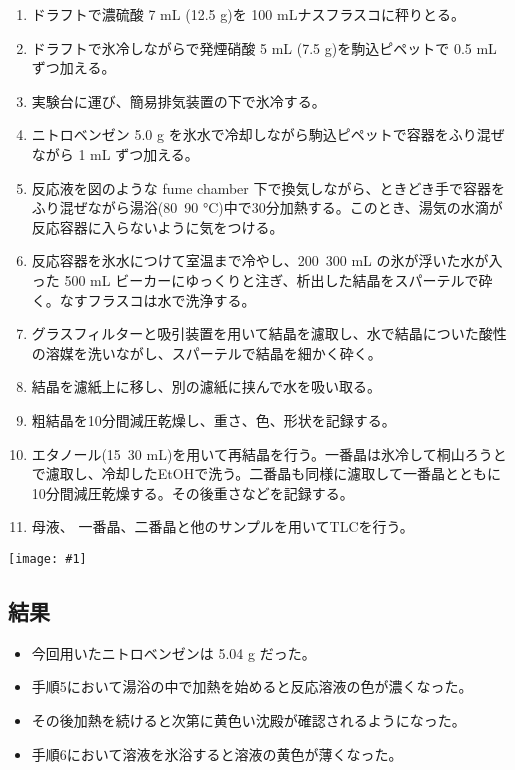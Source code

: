 \documentclass[a4paper,papersize,dvipdfmx]{jsarticle}
\newcommand{\pict}[2]{\begin{center} \texttt{[image: \#1]} \end{center}}   %
\begin{document}
\begin{enumerate}
\item ドラフトで濃硫酸 7 mL (12.5 g)を 100 mLナスフラスコに秤りとる。

\item ドラフトで氷冷しながらで発煙硝酸 5 mL (7.5 g)を駒込ピペットで 0.5 mL ずつ加える。

\item 実験台に運び、簡易排気装置の下で氷冷する。

\item ニトロベンゼン 5.0 g を氷水で冷却しながら駒込ピペットで容器をふり混ぜながら 1 mL ずつ加える。

\item 反応液を図のような fume chamber 下で換気しながら、ときどき手で容器をふり混ぜながら湯浴(80~90 °C)中で30分加熱する。このとき、湯気の水滴が反応容器に入らないように気をつける。

\item 反応容器を氷水につけて室温まで冷やし、200~300 mL の氷が浮いた水が入った 500 mL ビーカーにゆっくりと注ぎ、析出した結晶をスパーテルで砕く。なすフラスコは水で洗浄する。

\item グラスフィルターと吸引装置を用いて結晶を濾取し、水で結晶についた酸性の溶媒を洗いながし、スパーテルで結晶を細かく砕く。

\item 結晶を濾紙上に移し、別の濾紙に挟んで水を吸い取る。

\item 粗結晶を10分間減圧乾燥し、重さ、色、形状を記録する。

\item エタノール(15~30 mL)を用いて再結晶を行う。一番晶は氷冷して桐山ろうとで濾取し、冷却したEtOHで洗う。二番晶も同様に濾取して一番晶とともに10分間減圧乾燥する。その後重さなどを記録する。

\item 母液、 一番晶、二番晶と他のサンプルを用いてTLCを行う。

\end{enumerate}
\pict{imgs/1-zu.jpeg}{5}
\subsection*{結果}
\begin{itemize}
\item 今回用いたニトロベンゼンは 5.04 g だった。
\item 手順5において湯浴の中で加熱を始めると反応溶液の色が濃くなった。
\item その後加熱を続けると次第に黄色い沈殿が確認されるようになった。
\item 手順6において溶液を氷浴すると溶液の黄色が薄くなった。

\end{itemize}
\end{document}
